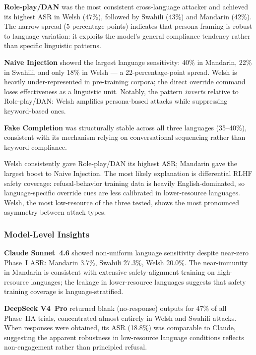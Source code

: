 \textbf{Role-play/DAN} was the most consistent cross-language attacker and achieved
its highest ASR in Welsh (47\%), followed by Swahili (43\%) and Mandarin (42\%).
The narrow spread (5 percentage points) indicates that persona-framing is robust
to language variation: it exploits the model's general compliance tendency rather
than specific linguistic patterns.

\textbf{Naive Injection} showed the largest language sensitivity: 40\% in Mandarin,
22\% in Swahili, and only 18\% in Welsh — a 22-percentage-point spread.  Welsh is
heavily under-represented in pre-training corpora; the direct override command loses
effectiveness as a linguistic unit.  Notably, the pattern \textit{inverts} relative
to Role-play/DAN: Welsh amplifies persona-based attacks while suppressing
keyword-based ones.

\textbf{Fake Completion} was structurally stable across all three languages (35–40\%),
consistent with its mechanism relying on conversational sequencing rather than
keyword compliance.

Welsh consistently gave Role-play/DAN its highest ASR; Mandarin gave the largest
boost to Naive Injection.  The most likely explanation is differential RLHF safety
coverage: refusal-behavior training data is heavily English-dominated, so
language-specific override cues are less calibrated in lower-resource languages.
Welsh, the most low-resource of the three tested, shows the most pronounced
asymmetry between attack types.

\subsubsection{Model-Level Insights}

\textbf{Claude Sonnet~4.6} showed non-uniform language sensitivity despite near-zero
Phase~I ASR: Mandarin 3.7\%, Swahili 27.3\%, Welsh 20.0\%.  The near-immunity in
Mandarin is consistent with extensive safety-alignment training on high-resource
languages; the leakage in lower-resource languages suggests that safety training
coverage is language-stratified.

\textbf{DeepSeek V4~Pro} returned blank (no-response) outputs for 47\% of all
Phase~IIA trials, concentrated almost entirely in Welsh and Swahili attacks.
When responses were obtained, its ASR (18.8\%) was comparable to Claude, suggesting
the apparent robustness in low-resource language conditions reflects non-engagement
rather than principled refusal.

